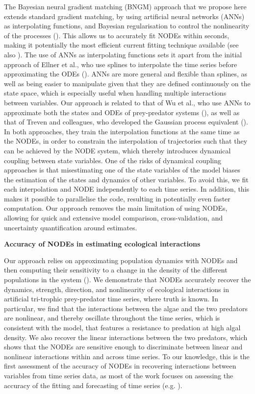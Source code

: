 \documentclass[11pt, oneside]{article}
\begin{document}
The Bayesian neural gradient matching (BNGM) approach that we propose here extends standard gradient matching, by using artificial neural networks (ANNs) as interpolating functions, and Bayesian regularisation to control the nonlinearity of the processes (\cite{Cawley2007}).
This allows us to accurately fit NODEs within seconds, making it potentially the most efficient current fitting technique available (see also \cite{Treven2021}). 
The use of ANNs as interpolating functions sets it apart from the initial approach of Ellner et al., who use splines to interpolate the time series before approximating the ODEs (\cite{Ellner2002}).
ANNs are more general and flexible than splines, as well as being easier to manipulate given that they are defined continuously on the state space, which is especially useful when handling multiple interactions between variables.
Our approach is related to that of Wu et al., who use ANNs to approximate both the states and ODEs of prey-predator systems (\cite{Wu2005}), as well as that of Treven and colleagues, who developed the Gaussian process equivalent (\cite{Treven2021}).
In both approaches, they train the interpolation functions at the same time as the NODEs, in order to constrain the interpolation of trajectories such that they can be achieved by the NODE system, which thereby introduces dynamical coupling between state variables.
One of the risks of dynamical coupling approaches is that misestimating one of the state variables of the model biases the estimation of the states and dynamics of other variables.
To avoid this, we fit each interpolation and NODE independently to each time series.
In addition, this makes it possible to parallelise the code, resulting in potentially even faster computation.
Our approach removes the main limitation of using NODEs, allowing for quick and extensive model comparison, cross-validation, and uncertainty quantification around estimates.

\textbf{Accuracy of NODEs in estimating ecological interactions}

Our approach relies on approximating population dynamics with NODEs and then computing their sensitivity to a change in the density of the different populations in the system (\cite{Bonnaffe2021a}). 
We demonstrate that NODEs accurately recover the dynamics, strength, direction, and nonlinearity of ecological interactions in artificial tri-trophic prey-predator time series, where truth is known.
In particular, we find that the interactions between the algae and the two predators are nonlinear, and thereby oscillate throughout the time series, which is consistent with the model, that features a resistance to predation at high algal density.
We also recover the linear interactions between the two predators, which shows that the NODEs are sensitive enough to discriminate between linear and nonlinear interactions within and across time series.
To our knowledge, this is the first assessment of the accuracy of NODEs in recovering interactions between variables from time series data, as most of the work focuses on assessing the accuracy of the fitting and forecasting of time series (e.g. \cite{Mai2016,Chen2018,Treven2021,Frank2022}).
\end{document}
